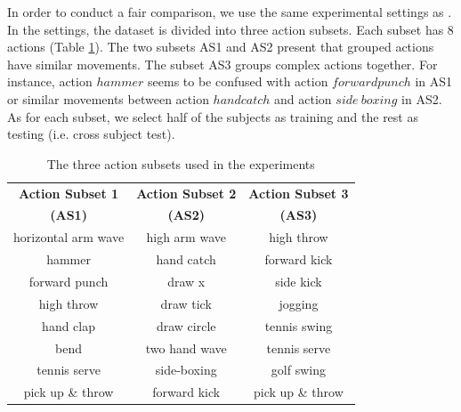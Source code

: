 \documentclass[review]{elsarticle}
\begin{document}
In order to conduct a fair comparison, we use the same experimental settings as \cite{li2010action, yang2012eigenjoints, yang2012recognizing, wang2012mining, xia2013spatio, oreifej2013hon4d}. In the settings, the dataset is divided into three action subsets. Each subset has 8 actions (Table \ref{lbl:3ActionSubsets}). The two subsets AS1 and AS2 present that grouped actions have similar movements. The subset AS3 groups complex actions together. For instance, action $hammer$ seems to be confused with action $forward punch$ in AS1 or similar movements between action $hand catch$ and action $side\ boxing$ in AS2. As for each subset, we select half of the subjects as training and the rest as testing (i.e. cross subject test).

\begin{table}[H]
	\begin{center}
		\begin{tabular}{c|c|c}
		
		{\bf Action Subset 1} & {\bf Action Subset 2} & {\bf Action Subset 3} \\
		{\bf(AS1)} & {\bf(AS2)} & {\bf(AS3)} \\
		\hline
		horizontal arm wave &  high arm wave &     high throw \\
		
		        hammer &     hand catch &   forward kick \\
		
		 forward punch &         draw x &      side kick \\
		
		    high throw &      draw tick &        jogging \\
		
		     hand clap &    draw circle &   tennis swing \\
		
		          bend &  two hand wave &   tennis serve \\
		
		  tennis serve &    side-boxing &     golf swing \\
		
		pick up \& throw &   forward kick & pick up \& throw \\
		
		\end{tabular}
	\end{center}
	\caption{\label{lbl:3ActionSubsets}The three action subsets used in the experiments}
\end{table}
\end{document}
